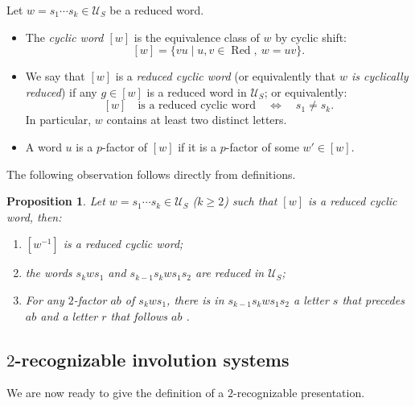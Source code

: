 \documentclass[A4paper, oneside]{amsart}
\newcommand{\Red}{\operatorname{Red}}
\newcommand{\U}{\mathcal{U}}
\newtheorem{prop}[thm]{Proposition}
\theoremstyle{definition}
\begin{document}
 Let  $w=s_1\cdots s_k\in \U_S$  be a reduced word. 
\begin{itemize}
\item The {\em cyclic word  $[w]$} is the equivalence class of $w$ by cyclic shift:
$$
[w]=\{vu\mid u,v\in \Red,\ w=uv\}.
$$
\item We say that $[w]$ is a {\em reduced cyclic word} (or equivalently that {\em $w$ is cyclically reduced}) if any $g\in [w]$ is a reduced word in $\U_S$; or equivalently:  
\begin{equation}
\label{eq:CyclicRed}
[w]\quad \text{is a reduced cyclic word} \quad \iff\quad s_1\not = s_k.
\end{equation}
In particular, $w$ contains at least two distinct letters.

\item A word $u$ is a $p$-factor of $[w]$ if it is a $p$-factor of some $w' \in [w]$.  
\end{itemize}

The following observation follows directly from definitions.

\begin{prop}
\label{prop:Factor}
Let $w=s_1\cdots s_k\in \U_S$ ($k\geq 2$) such that $[w]$ is a reduced cyclic word, then:
\begin{enumerate}
\item $[w^{-1}]$ is a reduced cyclic word;
 \item the words $s_kws_1$ and  $s_{k-1} s_kws_1 s_2$ are reduced in $\U_S$;
 \item For any $2$-factor $ab$ of $s_kws_1$, there is in  $s_{k-1} s_kws_1 s_2$ a letter $s$ that precedes $ab$ and a letter $r$ that follows $ab$ .
  \end{enumerate}
\end{prop}

\subsection{$2$-recognizable involution systems}   
\label{ss:2-recog}

We are now ready to give the definition of a $2$-recognizable presentation.
\end{document}
